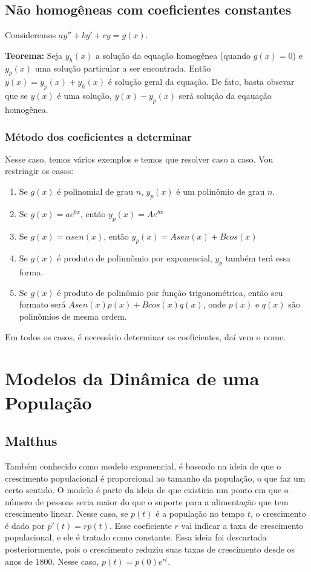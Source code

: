 \documentclass[12pt]{article}
\begin{document}
\subsection{Não homogêneas com coeficientes constantes}

Consideremos $ay'' + by' + cy = g(x)$.  

\textbf{Teorema:} Seja $y_h(x)$ a solução da equação homogênea (quando $g(x) =
0$) e $y_p(x)$ uma solução particular a ser encontrada. Então $y(x) = y_p(x) +
y_h(x)$ é solução geral da equação. De fato, basta obsevar que se $y(x)$ é uma
solução, $y(x) - y_p(x)$ será solução da eqauação homogênea. 

\subsubsection{Método dos coeficientes a determinar}

Nesse caso, temos vários exemplos e temos que resolver caso a caso. Vou
restringir os casos:

\begin{enumerate}
    \item Se $g(x)$ é polinomial de grau $n$, $y_p(x)$ é um polinômio de grau
    $n$. 
    \item Se $g(x) = ae^{bx}$, então $y_p(x) = Ae^{bx}$
    \item Se $g(x) = \alpha sen(x)$, então $y_p(x) = Asen(x) + Bcos(x)$
    \item Se $g(x)$ é produto de polinnômio por exponencial, $y_p$ também terá
   essa forma. 
   \item Se $g(x)$ é produto de polinômio por função trigonométrica, então seu
  formato será  $Asen(x)p(x) + Bcos(x)q(x)$, onde $p(x)$ e $q(x)$ são
  polinômios de mesma ordem. 
\end{enumerate}

Em todos os casos, é necessário determinar os coeficientes, daí vem o nome. 
    
\section{Modelos da Dinâmica de uma População}

\subsection{Malthus} 
Também conhecido como modelo exponencial, é
baseado na ideia de que o crescimento populacional é proporcional ao
tamanho da população, o que faz um certo sentido. O modelo é parte da
ideia de que existiria um ponto em que o número de pessoas seria maior do
que o suporte para a alimentação que tem crescimento linear. Nesse caso,
se $p(t)$ é a população no tempo $t$, o crescimento é dado por $p'(t) =
rp(t)$. Esse coeficiente $r$ vai indicar a taxa de crescimento
populacional, e ele é tratado como constante. Essa ideia foi descartada
posteriormente, pois o crescimento reduziu suas taxas de crescimento desde
os anos de 1800. Nesse caso, $p(t) = p(0)e^{rt}$. 
\end{document}
